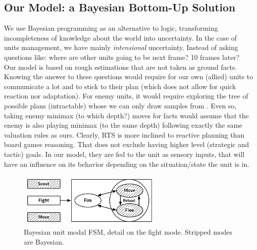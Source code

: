 \subsection{Our Model: a Bayesian Bottom-Up Solution}

We use Bayesian programming as an alternative to logic, transforming incompleteness of knowledge about the world into uncertainty. In the case of units management, we have mainly \textit{intensional} uncertainty. Instead of asking questions like: where are other units going to be next frame? 10 frames later? Our model is based on rough estimations that are not taken as ground facts. Knowing the answer to these questions would require for our own (allied) units to communicate a lot and to stick to their plan (which does not allow for quick reaction nor adaptation). For enemy units, it would require exploring the tree of possible plans (intractable) whose we can only draw samples from \citep{UCT}. Even so, taking enemy minimax (to which depth?) moves for facts would assume that the enemy is also playing minimax (to the same depth) following exactly the same valuation rules as ours. Clearly, RTS  is more inclined to reactive planning than board games reasoning. That does not exclude having higher level (strategic and tactic) goals. In our model, they are fed to the unit as sensory inputs, that will have an influence on its behavior depending on the situation/state the unit is in.

\begin{figure}[!ht]
\begin{center}
\includegraphics[width=7cm]{images/unit_HFSM.pdf}
\end{center}
\label{fig:unit_HFSM}
\caption{Bayesian unit modal FSM, detail on the fight mode. Stripped modes are Bayesian.}
\end{figure}

